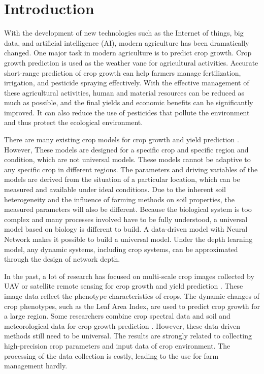\documentclass[acmsmall,manuscript, screen, review]{acmart}
\begin{document}
\section{Introduction}
With the development of new technologies such as the Internet of things, big data, and artificial intelligence (AI), modern agriculture has been dramatically changed. One major task in modern agriculture is to predict crop growth. Crop growth prediction is used as the weather vane for agricultural activities. Accurate short-range prediction of crop growth can help farmers manage fertilization, irrigation, and pesticide spraying effectively. With the effective management of these agricultural activities, human and material resources can be reduced as much as possible, and the final yields and economic benefits can be significantly improved. It can also reduce the use of pesticides that pollute the environment and thus protect the ecological environment. 

There are many existing crop models for crop growth and yield prediction \cite{book,BRISSON2003309,boogaard1998wofost}. However, These models are designed for a specific crop and specific region and condition, which are not universal models. These models cannot be adaptive to any specific crop in different regions. The parameters and driving variables of the models are derived from the situation of a particular location, which can be measured and available under ideal conditions. Due to the inherent soil heterogeneity and the influence of farming methods on soil properties, the measured parameters will also be different. Because the biological system is too complex and many processes involved have to be fully understood, a universal model based on biology is different to build. A data-driven model with Neural Network makes it possible to build a universal model. Under the depth learning model, any dynamic systems, including crop systems, can be approximated through the design of network depth. 

In the past, a lot of research has focused on multi-scale crop images collected by UAV or satellite remote sensing for crop growth and yield prediction \cite{wang_new_2022,yue_estimate_2019,turkoglu_crop_2021}
. These image data reflect the phenotype characteristics of crops. The dynamic changes of crop phenotypes, such as the Leaf Area Index, are used to predict crop growth for a large region. Some researchers combine crop spectral data and soil and meteorological data for crop growth prediction \cite{trnka_effect_2007,islam_deep_2018,adisa_application_2019,liu_neural_2001,matsumura_maize_2015}
. However, these data-driven methods still need to be universal. The results are strongly related to collecting high-precision crop parameters and input data of crop environment. The processing of the data collection is costly, leading to the use for farm management hardly. 
\end{document}
